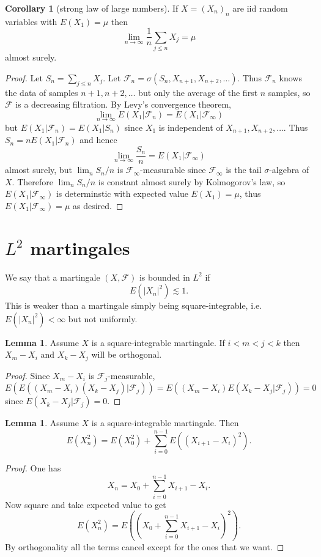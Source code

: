 \documentclass[12pt]{book}
\theoremstyle{definition}
\newtheorem{lemma}[theorem]{Lemma}
\newtheorem{corollary}[theorem]{Corollary}
\begin{document}
\begin{corollary}[strong law of large numbers]
If $X = (X_n)_n$ are iid random variables with $E(X_1) = \mu$ then
$$\lim_{n \to \infty} \frac{1}{n} \sum_{j\leq n} X_j = \mu$$
almost surely.
\end{corollary}
\begin{proof}
Let $S_n = \sum_{j \leq n} X_j$. Let $\mathcal F_n = \sigma(S_n, X_{n+1}, X_{n+2}, \dots)$.
Thus $\mathcal F_n$ knows the data of samples $n + 1, n + 2, \dots$ but only the average of the first $n$ samples, so $\mathcal F$ is a decreasing filtration.
By Levy's convergence theorem,
$$\lim_{n \to \infty} E(X_1|\mathcal F_n) = E(X_1|\mathcal F_\infty)$$
but $E(X_1|\mathcal F_n) = E(X_1|S_n)$ since $X_1$ is independent of $X_{n+1}, X_{n+2}, \dots$.
Thus $S_n = nE(X_1|\mathcal F_n)$ and hence
$$\lim_{n \to \infty} \frac{S_n}{n} = E(X_1|\mathcal F_\infty)$$
almost surely, but $\lim_n S_n/n$ is $\mathcal F_\infty$-measurable since $\mathcal F_\infty$ is the tail $\sigma$-algebra of $X$.
Therefore $\lim_n S_n/n$ is constant almost surely by Kolmogorov's law, so $E(X_1|\mathcal F_\infty)$ is determinstic with expected value $E(X_1) = \mu$, thus $E(X_1|\mathcal F_\infty) = \mu$ as desired.
\end{proof}

\section{$L^2$ martingales}
We say that a martingale $(X, \mathcal F)$ is bounded in $L^2$ if
$$E(|X_n|^2) \lesssim 1.$$
This is weaker than a martingale simply being square-integrable, i.e. $E(|X_n|^2) < \infty$ but not uniformly.

\begin{lemma}
Assume $X$ is a square-integrable martingale.
If $i < m < j < k$ then $X_m - X_i$ and $X_k - X_j$ will be orthogonal.
\end{lemma}
\begin{proof}
Since $X_m - X_i$ is $\mathcal F_j$-measurable,
$$E(E((X_m - X_i)(X_k - X_j)|\mathcal F_j)) = E((X_m - X_i) E(X_k - X_j|\mathcal F_j)) = 0$$
since $E(X_k - X_j|\mathcal F_j) = 0$.
\end{proof}

\begin{lemma}
Assume $X$ is a square-integrable martingale.
Then
$$E(X_n^2) = E(X_0^2) + \sum_{i=0}^{n-1} E((X_{i+1} - X_i)^2).$$
\end{lemma}
\begin{proof}
One has
$$X_n = X_0 + \sum_{i=0}^{n-1} X_{i+1} - X_i.$$
Now square and take expected value to get
$$E(X_n^2) = E\left(\left(X_0 +\sum_{i=0}^{n-1} X_{i+1} - X_i\right)^2\right).$$
By orthogonality all the terms cancel except for the ones that we want.
\end{proof}
\end{document}
